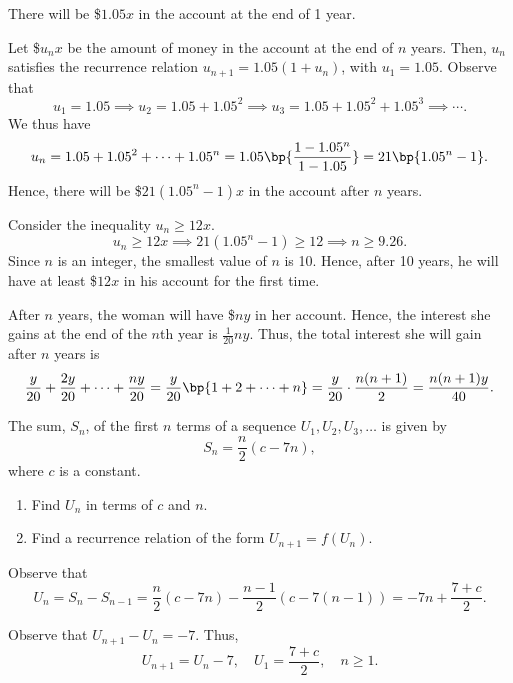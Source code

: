 \begin{solution}
    \begin{ppart}
        \begin{psubpart}
            There will be \$$1.05x$ in the account at the end of 1 year.
        \end{psubpart}
        \begin{psubpart}
            Let \$$u_nx$ be the amount of money in the account at the end of $n$ years. Then, $u_n$ satisfies the recurrence relation $u_{n+1} = 1.05(1 + u_n)$, with $u_1 = 1.05$. Observe that \[u_1 = 1.05 \implies u_2 = 1.05 + 1.05^2 \implies u_3 = 1.05 + 1.05^2 + 1.05^3 \implies \cdots.\] We thus have \[u_n = 1.05 + 1.05^2 + \cdots + 1.05^n = 1.05 \bp{\frac{1 - 1.05^n}{1 - 1.05}} = 21\bp{1.05^n - 1}.\]Hence, there will be \$$21(1.05^n - 1)x$ in the account after $n$ years.
        \end{psubpart}
        \begin{psubpart}
            Consider the inequality $u_n \geq 12x$. \[u_n \geq 12x \implies 21(1.05^n - 1) \geq 12 \implies n \geq 9.26.\] Since $n$ is an integer, the smallest value of $n$ is 10. Hence, after 10 years, he will have at least \$$12x$ in his account for the first time.
        \end{psubpart}
    \end{ppart}
    \begin{ppart}
        After $n$ years, the woman will have \$$ny$ in her account. Hence, the interest she gains at the end of the $n$th year is $\frac1{20}ny$. Thus, the total interest she will gain after $n$ years is \[\frac{y}{20} + \frac{2y}{20} + \cdots + \frac{ny}{20} = \frac{y}{20} \bp{1 + 2 + \cdots + n} = \frac{y}{20} \cdot \frac{n(n+1)}{2} = \frac{n(n+1)y}{40}.\]
    \end{ppart}
\end{solution}

\begin{problem}
    The sum, $S_n$, of the first $n$ terms of a sequence $U_1, U_2, U_3, \ldots$ is given by \[S_n = \frac{n}2 (c-7n),\] where $c$ is a constant.

    \begin{enumerate}
        \item Find $U_n$ in terms of $c$ and $n$.
        \item Find a recurrence relation of the form $U_{n+1} = f(U_n)$.
    \end{enumerate}
\end{problem}
\begin{solution}
    \begin{ppart}
        Observe that \[U_n = S_n - S_{n-1} = \frac{n}{2} (c-7n) - \frac{n-1}{2} (c - 7(n-1)) = -7n + \frac{7 + c}{2}.\]
    \end{ppart}
    \begin{ppart}
        Observe that $U_{n+1} - U_n = -7$. Thus, \[U_{n+1} = U_n - 7, \quad U_1 = \frac{7+c}2, \quad n \geq 1.\]
    \end{ppart}
\end{solution}

